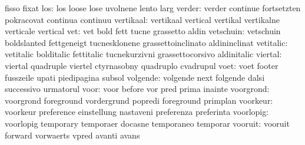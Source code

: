                            fisso                     fixat
                      los: los                       loose
                           lose                      uvolnene
                           lento                     larg
                   verder: verder                    continue
                           fortsetzten               pokracovat
                           continua                  continuu
                vertikaal: vertikaal                 vertical
                           vertikal                  vertikalne
                           verticale                 vertical
                      vet: vet                       bold
                           fett                      tucne
                           grassetto                 aldin
                vetschuin: vetschuin                 boldslanted
                           fettgeneigt               tucnesklonene
                           grassettoinclinato        aldininclinat
                vetitalic: vetitalic                 bolditalic
                           fettitalic                tucnekurzivni
                           grassettocorsivo          aldinitalic
                  viertal: viertal                   quadruple
                           viertel                   ctyrnasobny
                           quadruplo                 cvadrupul
                     voet: voet                      footer
                           fusszeile                 upati
                           piedipagina               subsol
                 volgende: volgende                  next
                           folgende                  dalsi
                           successivo                urmatorul
                     voor: voor                      before
                           vor                       pred
                           prima                     inainte
                voorgrond: voorgrond                 foreground
                           vordergrund               popredi
                           foreground                primplan
                 voorkeur: voorkeur                  preference
                           einstellung               nastaveni
                           preferenza                preferinta
                voorlopig: voorlopig                 temporary
                           temporaer                 docasne
                           temporaneo                temporar
                  vooruit: vooruit                   forward
                           vorwaerts                 vpred
                           avanti                    avans
